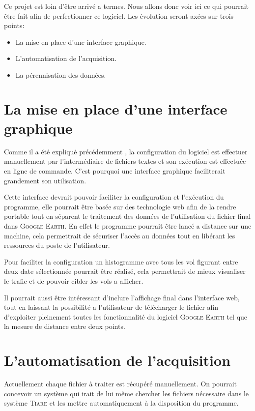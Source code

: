 \label{evolution}
Ce projet est loin d'être arrivé a termes. Nous allons donc voir ici ce qui pourrait être fait afin de perfectionner ce logiciel. Les évolution seront axées sur trois points:
\begin{itemize}
    \item La mise en place d'une interface graphique.
    \item L'automatisation de l'acquisition.
    \item La pérennisation des données.
\end{itemize}

\section{La mise en place d'une interface graphique}
Comme il a été expliqué précédemment , la configuration du logiciel est effectuer manuellement par l'intermédiaire de fichiers textes et son exécution est effectuée en ligne de commande. C'est pourquoi une interface graphique faciliterait grandement son utilisation.

Cette interface devrait pouvoir faciliter la configuration et l'exécution du programme, elle pourrait être basée sur des technologie web afin de la rendre portable tout en séparent le traitement des données de l'utilisation du fichier final dans \textsc{Google Earth}. En effet le programme pourrait être lancé a distance sur une machine, cela permettrait de sécuriser l'accès au données tout en libérant les ressources du poste de l'utilisateur.

Pour faciliter la configuration un histogramme avec tous les vol figurant entre deux date sélectionnée pourrait être réalisé, cela permettrait de mieux visualiser le trafic et de pouvoir cibler les vols a afficher.

Il pourrait aussi être intéressant d'inclure l'affichage final dans l'interface web, tout en laissant la possibilité a l'utilisateur de télécharger le fichier afin d'exploiter pleinement toutes les fonctionnalité du logiciel \textsc{Google Earth} tel que la mesure de distance entre deux points.

\section{L'automatisation de l'acquisition}
Actuellement chaque fichier à traiter est récupéré manuellement. On pourrait concevoir un système qui irait de lui même chercher les fichiers nécessaire dans le système \textsc{Tiare} et les mettre automatiquement à la disposition du programme.

